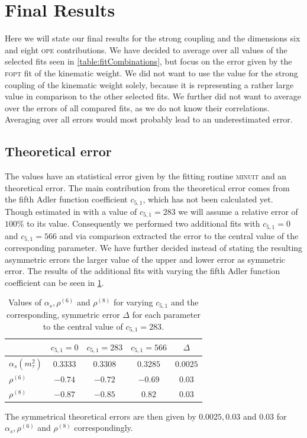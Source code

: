 \documentclass[../../index.tex]{subfiles}
\begin{document}
\section{Final Results}
Here we will state our final results for the strong coupling and the dimensions
six and eight \textsc{ope} contributions. We have decided to average over all
values of the selected fits seen in \cref{table:fitCombinations}, but focus on
the error given by the \textsc{fopt} fit of the kinematic weight. We did not
want to use the value for the strong coupling of the kinematic weight solely,
because it is representing a rather large value in comparison to the other
selected fits. We further did not want to average over the errors of all
compared fits, as we do not know their correlations. Averaging over all errors
would most probably lead to an underestimated error.

\subsection{Theoretical error}
The values have an statistical error given by the fitting routine
\textsc{minuit} and an theoretical error. The main contribution from the
theoretical error comes from the fifth Adler function coefficient \(c_{5,1}\),
which has not been calculated yet. Though estimated in \cite{Beneke2008} with a
value of \(c_{5,1} = 283\) we will assume a relative error of \(100\%\) to its
value. Consequently we performed two additional fits with \(c_{5,1} = 0 \) and
\(c_{5,1} = 566\) and via comparison extracted the error to the central value of
the corresponding parameter. We have further decided instead of stating the
resulting asymmetric errors the larger value of the upper and lower error as
symmetric error. The results of the additional fits with varying the fifth Adler
function coefficient can be seen in \cref{table:theoreticalError}.
\begin{table}
  \centering
  \begin{tabular}{lcccc}
    \toprule
    & \(c_{5,1} = 0\) & \cellcolor{primary}\(c_{5,1}=283\) & \(c_{5,1}=566\) & \(\Delta\)\\
    \midrule
    \(\alpha_s(m_\tau^2)\) & \(0.3333\) & \cellcolor{primary}\(0.3308\) & \(0.3285\) & \(0.0025\) \\
    \(\rho^{(6)}\) &  \(-0.74\) & \cellcolor{primary}\(-0.72\) & \(-0.69\) & \(0.03\) \\
    \(\rho^{(8)}\) & \(-0.87\) & \cellcolor{primary}\(-0.85\) & \(0.82\) & \(0.03\) \\
    \bottomrule
  \end{tabular}
  \caption{Values of \(\alpha_s, \rho^{(6)}\) and \(\rho^{(8)}\) for varying
    \(c_{5,1}\) and the corresponding, symmetric error \(\Delta\) for each
    parameter to the central value of \(c_{5,1} = 283\).}
  \label{table:theoreticalError}
\end{table}
The symmetrical theoretical errors are then given by \(0.0025, 0.03\) and
\(0.03\) for \(\alpha_s, \rho^{(6)}\) and \(\rho^{(8)}\) correspondingly.
\end{document}
